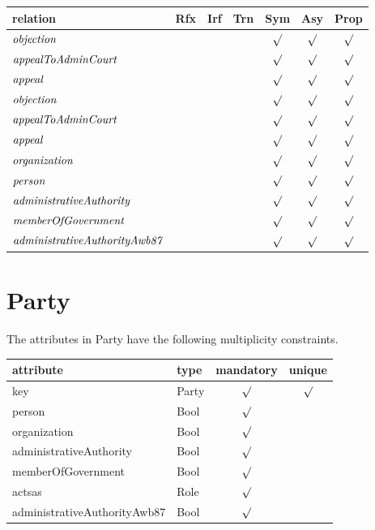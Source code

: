 \documentclass[10pt,a4paper]{report}              %
\theoremstyle{plain}\theorembodyfont{\rmfamily}\newtheorem{definition}{Definition}[section]
\theoremstyle{plain}\theorembodyfont{\rmfamily}\newtheorem{designrule}[definition]{Requirement}
\def\id#1{\mbox{\em #1\/}}
\begin{document}
\begin{center}
\begin{tabular}{lcccccc}
relation & Rfx & Irf & Trn & Sym & Asy & Prop\\
\hline
${\id{objection}}$ &  &  &  & $\surd$ & $\surd$ & $\surd$\\
${\id{appealToAdminCourt}}$ &  &  &  & $\surd$ & $\surd$ & $\surd$\\
${\id{appeal}}$ &  &  &  & $\surd$ & $\surd$ & $\surd$\\
${\id{objection}}~$ &  &  &  & $\surd$ & $\surd$ & $\surd$\\
${\id{appealToAdminCourt}}~$ &  &  &  & $\surd$ & $\surd$ & $\surd$\\
${\id{appeal}}~$ &  &  &  & $\surd$ & $\surd$ & $\surd$\\
${\id{organization}}$ &  &  &  & $\surd$ & $\surd$ & $\surd$\\
${\id{person}}$ &  &  &  & $\surd$ & $\surd$ & $\surd$\\
${\id{administrativeAuthority}}$ &  &  &  & $\surd$ & $\surd$ & $\surd$\\
${\id{memberOfGovernment}}$ &  &  &  & $\surd$ & $\surd$ & $\surd$\\
${\id{administrativeAuthorityAwb87}}$ &  &  &  & $\surd$ & $\surd$ & $\surd$\\
\end{tabular}
\end{center}

\section{Party}

\label{sct:plug Party}

The attributes in Party have the following multiplicity constraints. 

\begin{center}
\begin{tabular}{llcc}
attribute & type & mandatory & unique\\
\hline
key  & Party & $\surd$ & $\surd$\\
person & Bool & $\surd$ & \\
organization & Bool & $\surd$ & \\
administrativeAuthority & Bool & $\surd$ & \\
memberOfGovernment & Bool & $\surd$ & \\
actsas & Role & $\surd$ & \\
administrativeAuthorityAwb87 & Bool & $\surd$ & \\
\end{tabular}
\end{center}
\end{document}
